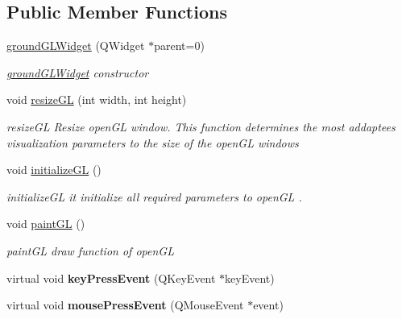 \subsection*{Public Member Functions}
\begin{DoxyCompactItemize}
\item 
\hyperlink{classgroundGLWidget_ace71a5495d43d9a7c44d309d99fa8588}{ground\-G\-L\-Widget} (Q\-Widget $\ast$parent=0)
\begin{DoxyCompactList}\small\item\em \hyperlink{classgroundGLWidget}{ground\-G\-L\-Widget} constructor \end{DoxyCompactList}\item 
void \hyperlink{classgroundGLWidget_a4851c8cda48540aa8dcbc587977b3c29}{resize\-G\-L} (int width, int height)
\begin{DoxyCompactList}\small\item\em resize\-G\-L Resize open\-G\-L window. This function determines the most addaptees visualization parameters to the size of the open\-G\-L windows \end{DoxyCompactList}\item 
\hypertarget{classgroundGLWidget_af0df613d7935ac62d02c60d279b169a1}{void \hyperlink{classgroundGLWidget_af0df613d7935ac62d02c60d279b169a1}{initialize\-G\-L} ()}\label{classgroundGLWidget_af0df613d7935ac62d02c60d279b169a1}

\begin{DoxyCompactList}\small\item\em initialize\-G\-L it initialize all required parameters to open\-G\-L . \end{DoxyCompactList}\item 
\hypertarget{classgroundGLWidget_a5ff9c3eb738112242c4151dae2e5b467}{void \hyperlink{classgroundGLWidget_a5ff9c3eb738112242c4151dae2e5b467}{paint\-G\-L} ()}\label{classgroundGLWidget_a5ff9c3eb738112242c4151dae2e5b467}

\begin{DoxyCompactList}\small\item\em paint\-G\-L draw function of open\-G\-L \end{DoxyCompactList}\item 
\hypertarget{classgroundGLWidget_a833bec87ec0d0769e6b33c97f744d2ec}{virtual void {\bfseries key\-Press\-Event} (Q\-Key\-Event $\ast$key\-Event)}\label{classgroundGLWidget_a833bec87ec0d0769e6b33c97f744d2ec}

\item 
\hypertarget{classgroundGLWidget_a0d3f814a70a30fa15ecb746ba4ddb6f5}{virtual void {\bfseries mouse\-Press\-Event} (Q\-Mouse\-Event $\ast$event)}\label{classgroundGLWidget_a0d3f814a70a30fa15ecb746ba4ddb6f5}


\end{DoxyCompactItemize}
